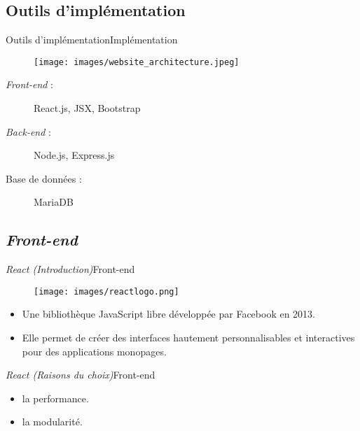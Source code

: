 \documentclass[usenames,dvipsnames]{beamer}
\begin{document}
\subsection{Outils d'implémentation}
\begin{frame}{Outils d'implémentation}{Implémentation}
  \begin{figure}[!ht]
    \centering
    \texttt{[image: images/website\_architecture.jpeg]}
  \end{figure}

  \begin{description}
    \item [\textit{Front-end} :] React.js, JSX, Bootstrap
    \item [\textit{Back-end} :] Node.js, Express.js
    \item [Base de données :] MariaDB
  \end{description}
\end{frame}
\subsection{\protect\textit{Front-end}}
\begin{frame}{\textit{React (Introduction)}}{Front-end}
  \begin{figure}[!ht]
    \texttt{[image: images/reactlogo.png]}
  \end{figure}

  \begin{itemize}
    \item Une bibliothèque JavaScript libre développée par Facebook en 2013.
    \item Elle permet de créer des interfaces hautement personnalisables et interactives pour des applications monopages.
  \end{itemize}
\end{frame}

\begin{frame}{\textit{React (Raisons du choix)}}{Front-end}
  \begin{itemize}
    \item la performance.
    \item la modularité.
  \end{itemize}
\end{frame}
\end{document}
